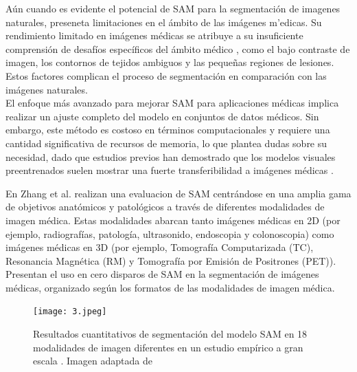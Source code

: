 \documentclass[12pt]{article}
\begin{document}
		
		
		A\'un cuando es evidente el potencial de SAM para la segmentaci\'on de imagenes naturales, preseneta limitaciones en el \'ambito de las im\'agenes m'edicas. Su rendimiento limitado en imágenes médicas se atribuye a su insuficiente comprensión de desafíos específicos del ámbito médico \parencite{Ma2023}, como el bajo contraste de imagen, los contornos de tejidos ambiguos y las pequeñas regiones de lesiones. Estos factores complican el proceso de segmentación en comparación con las imágenes naturales.
		\\
		
		El enfoque más avanzado para mejorar SAM para aplicaciones médicas implica realizar un ajuste completo del modelo en conjuntos de datos médicos. Sin embargo, este método es costoso en términos computacionales y requiere una cantidad significativa de recursos de memoria, lo que plantea dudas sobre su necesidad, dado que estudios previos han demostrado que los modelos visuales preentrenados suelen mostrar una fuerte transferibilidad a imágenes médicas \parencite{Raghu2019}. 
		
		En Zhang et al. \cite{Zhang2024SegmentAnything} realizan una evaluacion de SAM centrándose en una amplia gama de objetivos anatómicos y patológicos a través de diferentes modalidades de imagen médica. Estas modalidades abarcan tanto imágenes médicas en 2D (por ejemplo, radiografías, patología, ultrasonido, endoscopia y colonoscopia) como imágenes médicas en 3D (por ejemplo, Tomografía Computarizada (TC), Resonancia Magnética (RM) y Tomografía por Emisión de Positrones (PET)). Presentan el uso en cero disparos de SAM en la segmentación de imágenes médicas, organizado según los formatos de las modalidades de imagen médica.
		
		\begin{figure}[h] 
			\centering
			\caption{ Resultados cuantitativos de segmentación del modelo SAM en 18 modalidades de imagen diferentes en un estudio empírico a gran escala \cite{Huang2024}. Imagen adaptada de \cite{Zhang2024SegmentAnything}}
			\texttt{[image: 3.jpeg]}
			
			\label{fig:fig2}
			
			
		\end{figure}
		
		
		
\end{document}
